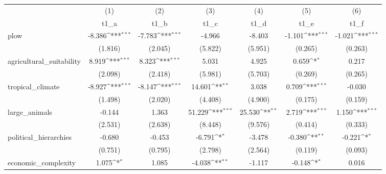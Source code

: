 {
\def\sym#1{\ifmmode^{#1}\else\(^{#1}\)\fi}
\begin{tabular}{l*{6}{c}}
\hline\hline
            &\multicolumn{1}{c}{(1)}&\multicolumn{1}{c}{(2)}&\multicolumn{1}{c}{(3)}&\multicolumn{1}{c}{(4)}&\multicolumn{1}{c}{(5)}&\multicolumn{1}{c}{(6)}\\
            &\multicolumn{1}{c}{t1\_a}&\multicolumn{1}{c}{t1\_b}&\multicolumn{1}{c}{t1\_c}&\multicolumn{1}{c}{t1\_d}&\multicolumn{1}{c}{t1\_e}&\multicolumn{1}{c}{t1\_f}\\
\hline
plow        &      -8.386\sym{***}&      -7.783\sym{***}&      -4.966         &      -8.403         &      -1.101\sym{***}&      -1.021\sym{***}\\
            &     (1.816)         &     (2.045)         &     (5.822)         &     (5.951)         &     (0.265)         &     (0.263)         \\
[1em]
agricultural\_suitability&       8.919\sym{***}&       8.323\sym{***}&       5.031         &       4.925         &       0.659\sym{*}  &       0.217         \\
            &     (2.098)         &     (2.418)         &     (5.981)         &     (5.703)         &     (0.269)         &     (0.265)         \\
[1em]
tropical\_climate&      -8.927\sym{***}&      -8.147\sym{***}&      14.601\sym{**} &       3.038         &       0.709\sym{***}&      -0.030         \\
            &     (1.498)         &     (2.020)         &     (4.408)         &     (4.900)         &     (0.175)         &     (0.159)         \\
[1em]
large\_animals&      -0.144         &       1.363         &      51.229\sym{***}&      25.530\sym{**} &       2.719\sym{***}&       1.150\sym{***}\\
            &     (2.531)         &     (2.638)         &     (8.448)         &     (9.576)         &     (0.414)         &     (0.333)         \\
[1em]
political\_hierarchies&      -0.680         &      -0.453         &      -6.791\sym{*}  &      -3.478         &      -0.380\sym{**} &      -0.221\sym{*}  \\
            &     (0.751)         &     (0.795)         &     (2.798)         &     (2.564)         &     (0.119)         &     (0.093)         \\
[1em]
economic\_complexity&       1.075\sym{*}  &       1.085         &      -4.038\sym{**} &      -1.117         &      -0.148\sym{*}  &       0.016         \\

\end{tabular}}
